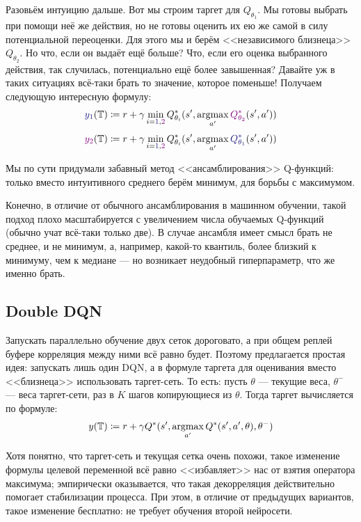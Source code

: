 Разовьём интуицию дальше. Вот мы строим таргет для $Q_{\theta_1}$. Мы готовы выбрать при помощи неё же действия, но не готовы оценить их ею же самой в силу потенциальной переоценки. Для этого мы и берём <<независимого близнеца>> $Q_{\theta_2}$. Но что, если он выдаёт ещё больше? Что, если его оценка выбранного действия, так случилась, потенциально ещё более завышенная? Давайте уж в таких ситуациях всё-таки брать то значение, которое поменьше! Получаем следующую интересную формулу:
$$\textcolor{ChadBlue}{y_1}(\T ) \coloneqq r + \gamma \min_{i = \textcolor{ChadBlue}{1}, \textcolor{ChadPurple}{2}}Q_{\theta_i}^*(s', \argmax\limits_{a'} \textcolor{ChadPurple}{Q_{\theta_2}^*}(s', a'))$$
$$\textcolor{ChadPurple}{y_2}(\T ) \coloneqq r + \gamma \min_{i = \textcolor{ChadBlue}{1}, \textcolor{ChadPurple}{2}}Q_{\theta_i}^*(s', \argmax\limits_{a'} \textcolor{ChadBlue}{Q_{\theta_1}^*}(s', a'))$$

Мы по сути придумали забавный метод <<ансамблирования>> Q-функций: только вместо интуитивного среднего берём минимум, для борьбы с максимумом. 

\begin{remark}
Конечно, в отличие от обычного ансамблирования в машинном обучении, такой подход плохо масштабируется с увеличением числа обучаемых Q-функций (обычно учат всё-таки только две). В случае ансамбля имеет смысл брать не среднее, и не минимум, а, например, какой-то квантиль, более близкий к минимуму, чем к медиане --- но возникает неудобный гиперпараметр, что же именно брать.
\end{remark}

\subsection{Double DQN}\label{subsec:doubledqn}

Запускать параллельно обучение двух сеток дороговато, а при общем реплей буфере корреляция между ними всё равно будет. Поэтому предлагается простая идея: запускать лишь один DQN, а в формуле таргета для оценивания вместо <<близнеца>> использовать таргет-сеть. То есть: пусть $\theta$ --- текущие веса, $\theta^{-}$ --- веса таргет-сети, раз в $K$ шагов копирующиеся из $\theta$. Тогда таргет вычисляется по формуле:
$$y(\mathbb{T} ) \coloneqq r + \gamma Q^*(s', \mathop{\mathrm{argmax}}\limits_{a'} Q^*(s', a', \theta), \theta^-)$$

Хотя понятно, что таргет-сеть и текущая сетка очень похожи, такое изменение формулы целевой переменной всё равно <<избавляет>> нас от взятия оператора максимума; эмпирически оказывается, что такая декорреляция действительно помогает стабилизации процесса. При этом, в отличие от предыдущих вариантов, такое изменение бесплатно: не требует обучения второй нейросети.


